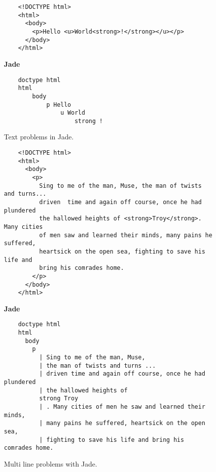 \begin{figure}[!htbp]
    \Large{\textbf{}}\normalsize{}
    \begin{verbatim}
    <!DOCTYPE html>
    <html>
      <body>
        <p>Hello <u>World<strong>!</strong></u></p>
      </body>
    </html>
    \end{verbatim}
    \Large{\textbf{Jade}}\normalsize{}
    \begin{verbatim}
    doctype html
    html
        body
            p Hello
                u World
                    strong !
    \end{verbatim}
    \caption{Text problems in Jade.}
    \label{fig:JadeProblem}
\end{figure}
\begin{figure}[!htbp]
    \Large{\textbf{}}\normalsize{}
    \begin{verbatim}
    <!DOCTYPE html>
    <html>
      <body>
        <p>
          Sing to me of the man, Muse, the man of twists and turns... 
          driven  time and again off course, once he had plundered
          the hallowed heights of <strong>Troy</strong>. Many cities
          of men saw and learned their minds, many pains he suffered, 
          heartsick on the open sea, fighting to save his life and 
          bring his comrades home.
        </p>
      </body>
    </html>
    \end{verbatim}
    \Large{\textbf{Jade}}\normalsize{}
    \begin{verbatim}
    doctype html
    html
      body
        p
          | Sing to me of the man, Muse, 
          | the man of twists and turns ... 
          | driven time and again off course, once he had plundered 
          | the hallowed heights of 
          strong Troy 
          | . Many cities of men he saw and learned their minds, 
          | many pains he suffered, heartsick on the open sea, 
          | fighting to save his life and bring his comrades home. 
    \end{verbatim}
    \caption{Multi line problems with Jade.}
    \label{fig:JadeMultiLine}
\end{figure}
\newpage
